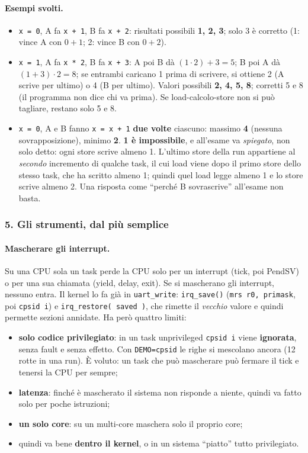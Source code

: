 \paragraph*{Esempi svolti.}
\begin{itemize}
    \item \texttt{x = 0}, A fa \texttt{x + 1}, B fa \texttt{x + 2}: risultati possibili \textbf{1, 2, 3}; solo 3 è corretto (1: vince A con $0+1$; 2: vince B con $0+2$).
    \item \texttt{x = 1}, A fa \texttt{x * 2}, B fa \texttt{x + 3}: A poi B dà $(1 \cdot 2) + 3 = 5$; B poi A dà $(1 + 3) \cdot 2 = 8$; se entrambi caricano 1 prima di scrivere, si ottiene 2 (A scrive per ultimo) o 4 (B per ultimo). Valori possibili \textbf{2, 4, 5, 8}; corretti 5 e 8 (il programma non dice chi va prima). Se load-calcolo-store non si può tagliare, restano solo 5 e 8.
    \item \texttt{x = 0}, A e B fanno \texttt{x = x + 1} \textbf{due volte} ciascuno: massimo \textbf{4} (nessuna sovrapposizione), minimo \textbf{2}. \textbf{1 è impossibile}, e all'esame va \emph{spiegato}, non solo detto: ogni store scrive almeno 1. L'ultimo store della run appartiene al \emph{secondo} incremento di qualche task, il cui load viene dopo il primo store dello stesso task, che ha scritto almeno 1; quindi quel load legge almeno 1 e lo store scrive almeno 2. Una risposta come ``perché B sovrascrive'' all'esame non basta.
\end{itemize}

\subsubsection*{5. Gli strumenti, dal più semplice}
\paragraph*{Mascherare gli interrupt.} Su una CPU sola un task perde la CPU solo per un interrupt (tick, poi PendSV) o per una sua chiamata (yield, delay, exit). Se si mascherano gli interrupt, nessuno entra. Il kernel lo fa già in \texttt{uart\_write}: \texttt{irq\_save()} (\texttt{mrs r0, primask}, poi \texttt{cpsid i}) e \texttt{irq\_restore( saved )}, che rimette il \emph{vecchio} valore e quindi permette sezioni annidate. Ha però quattro limiti:
\begin{itemize}
    \item \textbf{solo codice privilegiato}: in un task unprivileged \texttt{cpsid i} viene \textbf{ignorata}, senza fault e senza effetto. Con \texttt{DEMO=cpsid} le righe si mescolano ancora (12 rotte in una run). È voluto: un task che può mascherare può fermare il tick e tenersi la CPU per sempre;
    \item \textbf{latenza}: finché è mascherato il sistema non risponde a niente, quindi va fatto solo per poche istruzioni;
    \item \textbf{un solo core}: su un multi-core maschera solo il proprio core;
    \item quindi va bene \textbf{dentro il kernel}, o in un sistema ``piatto'' tutto privilegiato.
\end{itemize}


